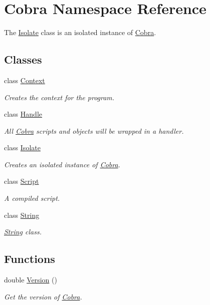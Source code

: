 \hypertarget{namespace_cobra}{\section{Cobra Namespace Reference}
\label{namespace_cobra}
}


The \hyperlink{class_cobra_1_1_isolate}{Isolate} class is an isolated instance of \hyperlink{namespace_cobra}{Cobra}.  


\subsection*{Classes}
\begin{DoxyCompactItemize}
\item 
class \hyperlink{class_cobra_1_1_context}{Context}
\begin{DoxyCompactList}\small\item\em Creates the context for the program. \end{DoxyCompactList}\item 
class \hyperlink{class_cobra_1_1_handle}{Handle}
\begin{DoxyCompactList}\small\item\em All \hyperlink{namespace_cobra}{Cobra} scripts and objects will be wrapped in a handler. \end{DoxyCompactList}\item 
class \hyperlink{class_cobra_1_1_isolate}{Isolate}
\begin{DoxyCompactList}\small\item\em Creates an isolated instance of \hyperlink{namespace_cobra}{Cobra}. \end{DoxyCompactList}\item 
class \hyperlink{class_cobra_1_1_script}{Script}
\begin{DoxyCompactList}\small\item\em A compiled script. \end{DoxyCompactList}\item 
class \hyperlink{class_cobra_1_1_string}{String}
\begin{DoxyCompactList}\small\item\em \hyperlink{class_cobra_1_1_string}{String} class. \end{DoxyCompactList}\end{DoxyCompactItemize}
\subsection*{Functions}
\begin{DoxyCompactItemize}
\item 
double \hyperlink{namespace_cobra_a47f407730fdb699b15ddbca1e55826b6}{Version} ()
\begin{DoxyCompactList}\small\item\em Get the version of \hyperlink{namespace_cobra}{Cobra}. \end{DoxyCompactList}\end{DoxyCompactItemize}


